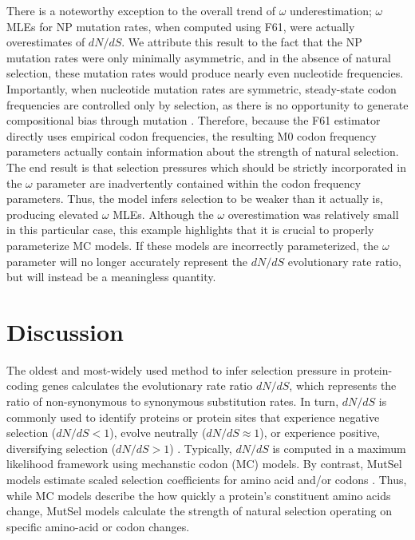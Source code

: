 \documentclass{pnastwo}
\begin{document}
\begin{article}
There is a noteworthy exception to the overall trend of $\omega$ underestimation; $\omega$ MLEs for NP mutation rates, when computed using F61, were actually overestimates of $dN/dS$. We attribute this result to the fact that the NP mutation rates were only minimally asymmetric, and in the absence of natural selection, these mutation rates would produce nearly even nucleotide frequencies. Importantly, when nucleotide mutation rates are symmetric, steady-state codon frequencies are controlled only by selection, as there is no opportunity to generate compositional bias through mutation \cite{SellaHirsh2005}. Therefore, because the F61 estimator directly uses empirical codon frequencies, the resulting M0 codon frequency parameters actually contain information about the strength of natural selection. The end result is that selection pressures which should be strictly incorporated in the $\omega$ parameter are inadvertently contained within the codon frequency parameters. Thus, the model infers selection to be weaker than it actually is, producing elevated $\omega$ MLEs. Although the $\omega$ overestimation was relatively small in this particular case, this example highlights that it is crucial to properly parameterize MC models. If these models are incorrectly parameterized, the $\omega$ parameter will no longer accurately represent the $dN/dS$ evolutionary rate ratio, but will instead be a meaningless quantity.
		
		
\section*{Discussion}
		
The oldest and most-widely used method to infer selection pressure in protein-coding genes calculates the evolutionary rate ratio $dN/dS$, which represents the ratio of non-synonymous to synonymous substitution rates. In turn, $dN/dS$ is commonly used to identify proteins or protein sites that experience negative selection ($dN/dS<1$), evolve neutrally ($dN/dS\approx1$), or experience positive, diversifying selection ($dN/dS>1$) \cite{NielsenYang1998, Yangetal2000, KosakovskyPondFrost2005b}. Typically, $dN/dS$ is computed in a maximum likelihood framework using mechanstic codon (MC) models. By contrast, MutSel models estimate scaled selection coefficients for amino acid and/or codons \cite{HalpernBruno1998,Rodrigueetal2010,Tamurietal2012,Thorne2012,Tamurietal2014}. Thus, while MC models describe the how quickly a protein's constituent amino acids change, MutSel models calculate the strength of natural selection operating on specific amino-acid or codon changes.  


\end{article}
\end{document}
